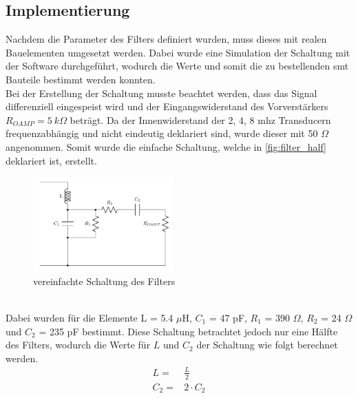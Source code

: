 \subsection*{Implementierung}
Nachdem die Parameter des Filters definiert wurden, muss dieses mit realen Bauelementen umgesetzt werden. Dabei wurde eine Simulation der Schaltung mit der Software  durchgeführt, wodurch die Werte und somit die zu bestellenden \ac{smt} Bauteile bestimmt werden konnten.\\
Bei der Erstellung der Schaltung musste beachtet werden, dass das Signal differenziell eingespeist wird und der Eingangswiderstand des Vorverstärkers $R_{OAMP}=5\ k\Omega$ beträgt. Da der Innenwiderstand der 2, 4, 8 \ac{mhz} Transducern frequenzabhängig und nicht eindeutig deklariert sind, wurde dieser mit 50 $\Omega$ angenommen. Somit wurde die einfache Schaltung, welche in \autoref{fig:filter_half} deklariert ist, erstellt.
\begin{figure}[!h]
	\centering
   	\includegraphics[width=0.48\textwidth]{images/Bandpass/half}
    \caption{vereinfachte Schaltung des Filters}
    \label{fig:filter_half}
\end{figure}\\
Dabei wurden für die Elemente L = 5.4 $\mu$H, $C_1$ = 47 pF, $R_1$ = 390 $\Omega$, $R_2$ = 24 $\Omega$ und $C_2$ = 235 pF bestimmt.
Diese Schaltung betrachtet jedoch nur eine Hälfte des Filters, wodurch die Werte für $L$ und $C_2$ der Schaltung wie folgt berechnet werden.
\begin{align*}
L=&\frac{L}{2}\\
C_2=&2\cdot C_2
\end{align*}
\clearpage
